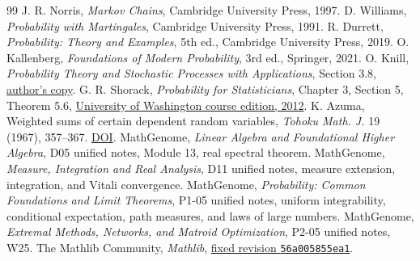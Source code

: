 \documentclass[11pt,oneside,openany]{book}
\theoremstyle{plain}
\theoremstyle{definition}
\theoremstyle{remark}
\begin{document}
\backmatter
\begingroup
\small
\begin{thebibliography}{99}
\setlength{\itemsep}{0.4em}
 J. R. Norris, \emph{Markov Chains},
  Cambridge University Press, 1997.
 D. Williams, \emph{Probability with Martingales},
  Cambridge University Press, 1991.
 R. Durrett, \emph{Probability: Theory and Examples},
  5th ed., Cambridge University Press, 2019.
 O. Kallenberg, \emph{Foundations of Modern Probability},
  3rd ed., Springer, 2021.
 O. Knill, \emph{Probability Theory and Stochastic Processes
  with Applications}, Section 3.8,
  \href{https://people.math.harvard.edu/~knill/books/KnillProbability.pdf}
       {author's copy}.
 G. R. Shorack, \emph{Probability for Statisticians},
  Chapter 3, Section 5, Theorem 5.6,
  \href{https://sites.stat.washington.edu/jaw/COURSES/520s/521/bk521reJaw2012.pdf}
       {University of Washington course edition, 2012}.
 K. Azuma, Weighted sums of certain dependent random
  variables, \emph{Tohoku Math. J.} 19 (1967), 357--367.
  \href{https://doi.org/10.2748/tmj/1178243286}{DOI}.
 MathGenome, \emph{Linear Algebra and Foundational Higher
  Algebra}, D05 unified notes, Module 13, real spectral theorem.
 MathGenome, \emph{Measure, Integration and Real Analysis},
  D11 unified notes, measure extension, integration, and Vitali convergence.
 MathGenome, \emph{Probability: Common Foundations and Limit
  Theorems}, P1-05 unified notes,
  uniform integrability, conditional expectation, path measures,
  and laws of large numbers.
 MathGenome, \emph{Extremal Methods, Networks, and
  Matroid Optimization}, P2-05 unified notes, W25.
 The Mathlib Community, \emph{Mathlib},
  \href{https://github.com/leanprover-community/mathlib4/tree/56a005855ea17e0b0958f73ec801ae140b0a1679}
       {fixed revision \texttt{56a005855ea1}}.
\end{thebibliography}
\endgroup
\end{document}
